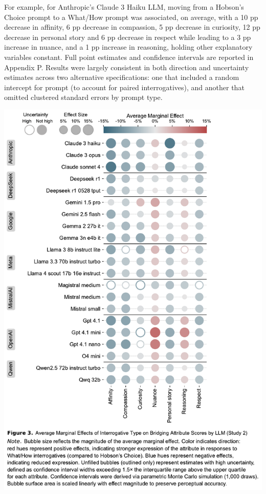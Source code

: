 \documentclass[
  12pt,
]{article}
\begin{document}
For example, for Anthropic's Claude 3 Haiku LLM, moving from a Hobson's Choice prompt to a What/How prompt was associated, on average, with a 10 pp decrease in affinity, 6 pp decrease in compassion, 5 pp decrease in curiosity, 12 pp decrease in personal story and 6 pp decrease in respect while leading to a 3 pp increase in nuance, and a 1 pp increase in reasoning, holding other explanatory variables constant. Full point estimates and confidence intervals are reported in Appendix P. Results were largely consistent in both direction and uncertainty estimates across two alternative specifications: one that included a random intercept for prompt (to account for paired interrogatives), and another that omitted clustered standard errors by prompt type.

\begin{center}\includegraphics{../03_outputs/03_experimental_analyses/figure_3} \end{center}
\end{document}
